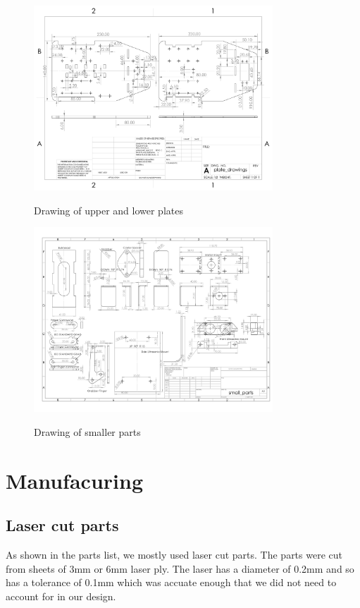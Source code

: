 \documentclass{article}
\begin{document}
\begin{figure}[H]
    \centering
    \includegraphics[width=0.8\textwidth]{assets/plate_drawings.JPG}
    \label{fig:plate_drawings}
    \caption{Drawing of upper and lower plates}
\end{figure}

\begin{figure}[H]
    \centering
    \includegraphics[width=0.8\textwidth]{assets/small_parts.JPG}
    \label{fig:smaller_parts}
    \caption{Drawing of smaller parts}
\end{figure}

\section{Manufacuring}

\subsection{Laser cut parts}
\quad As shown in the parts list, we mostly used laser cut parts. The parts were cut from sheets of 3mm or 6mm laser ply. The laser has a diameter of 0.2mm and so has a tolerance of 0.1mm which was accuate enough that we did not need to account for in our design.
\end{document}
